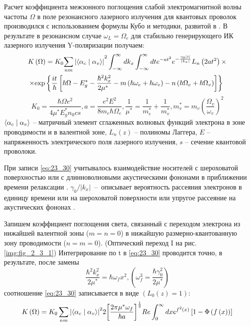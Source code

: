 {Расчет коэффициента межзонного поглощения слабой электромагнитной волны частоты $\Omega$ в поле резонансного лазерного излучения для квантовых проволок производился с использованием формулы Кубо \cite{Kubo1957a} и методики, развитой в \cite{Sinyavskii1974}. В результате в резонансном случае ${\omega }_L=\Omega_e$ для стабильно генерирующего ИК лазерного излучения Y-поляризации получаем:
\begin{multline} \label{eq:23_30}
K\left(\Omega\right)=K_0{\sum_{nm}{\left|\left\langle {\alpha }_c\mathrel{\left|\vphantom{{\alpha }_c {\alpha }_v}\right.\kern-\nulldelimiterspace}{\alpha }_v\right\rangle \right|}}^2\int^{\infty }_{-\infty }{dk_x}\int^{\infty }_{-\infty }{dt}e^{-at^2}e^{-\frac{{\gamma }_0\left|t\right|}{\left|k_x\right|}}L_n\left(2at^2\right)\times\\
\times {\exp \left\{\frac{it}{\hbar }\left[\hbar \Omega-E^*_g-\frac{{\hbar }^2k^2_x}{2{\mu }^*\ }-m\left(\hbar {\omega }_e+\hbar {\omega }_v\right)-n\left(\hbar \Omega_e+\hbar \Omega_v\right)\right]\right\}\ }
\end{multline}
\[
K_0=\frac{\hbar \Omega e^2}{4{\mu }^*E^*_gn_0cs}, 
a=\frac{e^2E^2}{8m_e\hbar \Omega_e}, \frac{1}{{\mu }^*}=\frac{1}{m^*_e}+\frac{1}{m^*_v}, m^*_v=m_v{\left(\frac{\Omega_v}{{\omega }_v}\right)}^2
\] 
$\left\langle {\alpha }_c\mathrel{\left|\vphantom{{\alpha }_c {\alpha }_v}\right.\kern-\nulldelimiterspace}{\alpha }_v\right\rangle $ -- матричный элемент сглаженных волновых функций электрона в зоне проводимости и в валентной зоне, $L_n\left(z\right)$ -- полиномы Лаггера, $E$ -- напряженность электрического поля лазерного излучения, $s$ -- сечение квантовой проволоки. 

При записи \eqref{eq:23_30} учитывалось взаимодействие носителей с шероховатой поверхностью или с длинноволновыми акустическими фононами в приближении времени релаксации \cite{Khamidullin2002}. ${{\gamma }_0}/{\left|k_x\right|}$~--~описывает вероятность рассеяния электронов в единицу времени или на шероховатой поверхности \cite{Karapetyan2012} или упругое рассеяние на акустических фононах \cite{Khamidullin2006}.

Запишем коэффициент поглощения света, связанный с переходом электрона из нижайшей валентной зоны ($m=n=0$) в нижайшую размерно-квантованную зону проводимости ($n=m=0$). (Оптический переход I на рис. \ref{img:fig_2_3_1}) Интегрирование по t в  \eqref{eq:23_30} проводится точно, в результате, после замены
\[
\frac{{\hbar }^2k^2_x}{2{\mu }^*}=\hbar {\omega }_fx^2, \left({\omega }^3_f=\frac{\hbar {\gamma }^2_0}{2{\mu }^*}\right)
\] 
соотношение  \eqref{eq:23_30} записывается в виде $\left(L_0\left(z\right)=1\right)$:
\begin{equation} \label{eq:23_40}
K\left(\Omega\right)=K_0\sum_{nm}{{\left|\left\langle {\alpha }_c\mathrel{\left|\vphantom{{\alpha }_c {\alpha }_v}\right.\kern-\nulldelimiterspace}{\alpha }_v\right\rangle \right|}^2}2{\left[\frac{2\pi {\mu }^*{\omega }_f}{\hbar a}\right]}^{\frac{1}{2}}Re\int^{\infty }_0{dx}e^{f^2\left(x\right)}\left[1-\Phi \left(f\left(x\right)\right)\right]
\end{equation}

}
